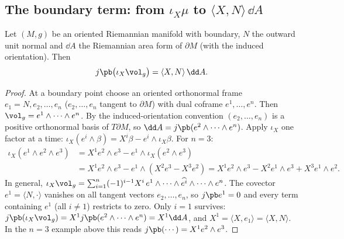 \subsection{The boundary term: from $\iota_X\mu$ to $\langle X,N\rangle\,\dd A$}\label{sec:boundaryterm}

\begin{lemma}\label{lem:fluxbdry}
Let $(M,g)$ be an oriented Riemannian manifold with boundary, $N$ the outward unit normal and $\dd A$ the Riemannian area form of $\partial M$ (with the induced orientation). Then
\[
j\pb\bigl(\iota_X\vol_g\bigr)=\langle X,N\rangle\,\dd A .
\]
\end{lemma}
\begin{proof}
 At a boundary point choose an oriented orthonormal frame $e_1=N,e_2,\dots,e_n$ ($e_2,\dots,e_n$ tangent to $\partial M$) with dual coframe $e^1,\dots,e^n$. Then $\vol_g=e^1\wedge\cdots\wedge e^n$. By the induced-orientation convention $(e_2,\dots,e_n)$ is a positive orthonormal basis of $T\partial M$, so $\dd A=j\pb(e^2\wedge\cdots\wedge e^n)$.
 Apply $\iota_X$ one factor at a time: $\iota_X(e^i\wedge\beta)=X^i\beta-e^i\wedge\iota_X\beta$. For $n=3$:
\begin{align*}
\iota_X(e^1\wedge e^2\wedge e^3)&=X^1e^2\wedge e^3-e^1\wedge\iota_X(e^2\wedge e^3)\\
&=X^1e^2\wedge e^3-e^1\wedge(X^2e^3-X^3e^2)=X^1e^2\wedge e^3-X^2e^1\wedge e^3+X^3e^1\wedge e^2 .
\end{align*}
In general, $\iota_X\vol_g=\sum_{i=1}^n(-1)^{i-1}X^i\,e^1\wedge\cdots\wedge\widehat{e^i}\wedge\cdots\wedge e^n$.
 The covector $e^1=\langle N,\cdot\rangle$ vanishes on all tangent vectors $e_2,\dots,e_n$, so $j\pb e^1=0$ and every term containing $e^1$ (all $i\ne1$) restricts to zero. Only $i=1$ survives: $j\pb(\iota_X\vol_g)=X^1j\pb(e^2\wedge\cdots\wedge e^n)=X^1\dd A$, and $X^1=\langle X,e_1\rangle=\langle X,N\rangle$. In the $n=3$ example above this reads $j\pb(\cdots)=X^1e^2\wedge e^3$.
\end{proof}
